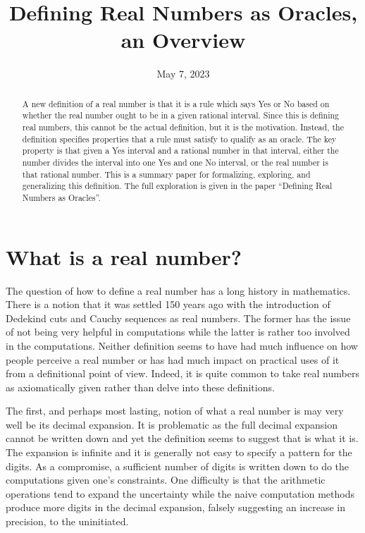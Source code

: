 \documentclass[12pt]{article}
\title{Defining Real Numbers as Oracles, an Overview}
\date{May 7, 2023}
\begin{document}
\maketitle
\begin{abstract}
A new definition of a real number is that it is a rule which says Yes or No based on whether the real number ought to be in a given rational interval. Since this is defining real numbers, this cannot be the actual definition, but it is the motivation. Instead, the definition specifies properties that a rule must satisfy to qualify as an oracle. The key property is that given a Yes interval and a rational number in that interval, either the number divides the interval into one Yes and one No interval, or the real number is that rational number. This is a summary paper for formalizing, exploring, and generalizing this definition. The full exploration is given in the paper ``Defining Real Numbers as Oracles''. 
\end{abstract}



\section{What is a real number?}

The question of how to define a real number has a long history in mathematics. There is a notion that it was settled 150 years ago with the introduction of Dedekind cuts and Cauchy sequences as real numbers. The former has the issue of not being very helpful in computations while the latter is rather too involved in the computations. Neither definition seems to have had much influence on how people perceive a real number or has had much impact on practical uses of it from a definitional point of view. Indeed, it is quite common to take real numbers as axiomatically given rather than delve into these definitions.

The first, and perhaps most lasting, notion of what a real number is may very well be its decimal expansion. It is problematic as the full decimal expansion cannot be written down and yet the definition seems to suggest that is what it is. The expansion is infinite and it is generally not easy to specify a pattern for the digits. As a compromise, a sufficient number of digits is written down to do the computations given one's constraints. One difficulty is that the arithmetic operations tend to expand the uncertainty while the naive computation methods produce more digits in the decimal expansion, falsely suggesting an increase in precision, to the uninitiated.
\end{document}

